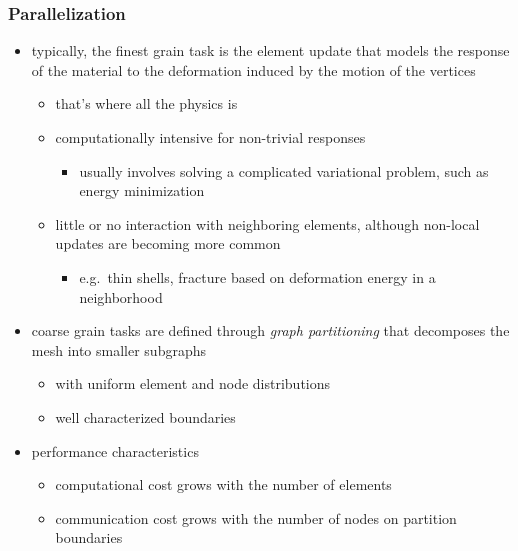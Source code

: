 \begin{frame}[fragile]
%
  \frametitle{Parallelization}
%
  \begin{minipage}{.80\linewidth}
%
    \begin{itemize}
%
    \item typically, the finest grain task is the element update that models the response of the
      material to the deformation induced by the motion of the vertices
      \begin{itemize}
      \item that's where all the physics is
      \item computationally intensive for non-trivial responses
        \begin{itemize}
        \item usually involves solving a complicated variational problem, such as energy
          minimization
        \end{itemize}
      \item little or no interaction with neighboring elements, although non-local updates are
        becoming more common
        \begin{itemize}
        \item e.g.~thin shells, fracture based on deformation energy in a neighborhood
        \end{itemize}
      \end{itemize}
%
    \item coarse grain tasks are defined through {\em graph partitioning} that decomposes the
      mesh into smaller subgraphs
      \begin{itemize}
      \item with uniform element and node distributions
      \item well characterized boundaries
      \end{itemize}
% 
    \item performance characteristics
      \begin{itemize}
      \item computational cost grows with the number of elements
      \item communication cost grows with the number of nodes on partition boundaries
      \end{itemize}
%
    \end{itemize}
%
  \end{minipage}
%
  \hfill
  \begin{minipage}{.17\linewidth}

\end{minipage}
\end{frame}
